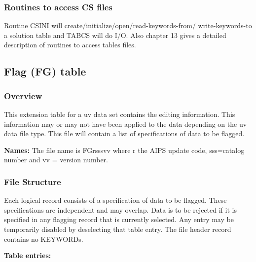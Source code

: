 \subsubsection{Routines to access CS files}
     Routine CSINI will
create/initialize/open/read-keywords-from/ write-keywords-to a
solution table and TABCS will do I/O.  Also chapter 13
gives a detailed description of routines to access tables files.
 

\subsection{Flag (FG) table}
\subsubsection{Overview}

   This extension table for a uv data set contains the
editing  information.  This information may or may not have been
applied to the data depending on the uv data file type. This file will
contain a list of specifications of data to be flagged.

{\bf Names:} The file name is FGrsssvv where r the AIPS update code,
sss=catalog number and vv = version number.

\subsubsection{File Structure}

     Each logical record consists of a specification of data to be
flagged.  These specifications are independent and may overlap.  Data
is to be rejected if it is specified in any flagging record that is
currently selected.  Any entry may be temporarily disabled by
deselecting that table entry.  The file header record contains no
KEYWORDs.

{\bf Table entries:}

